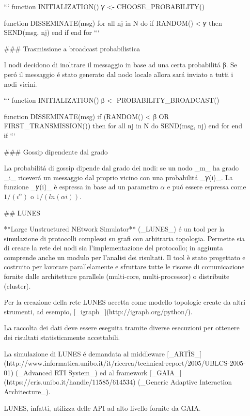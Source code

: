 ```
function INITIALIZATION()
    𝛾 <- CHOOSE\_PROBABILITY()

function DISSEMINATE(msg)
    for all nj in N do
        if RANDOM() < 𝛾 then
            SEND(msg, nj)
        end if
    end for
```

### Trasmissione a broadcast probabilistica

I nodi decidono di inoltrare il messaggio in base ad una certa probabilitá β. Se peró il messaggio é stato generato dal nodo locale allora sará inviato a tutti i nodi vicini.

```
function INITIALIZATION()
    β <- PROBABILITY\_BROADCAST()

function DISSEMINATE(msg)
    if (RANDOM() < β OR FIRST\_TRANSMISSION()) then
        for all nj in N do
            SEND(msg, nj)
        end for
    end if
```

### Gossip dipendente dal grado

La probabilitá di gossip dipende dal grado dei nodi: se un nodo \_m\_ ha grado \_i\_ riceverá un messaggio dal proprio vicino con una probabilitá \_𝛾(i)\_. La funzione \_𝛾(i)\_ è espressa in base ad un parametro $α$ e puó essere espressa come $1/(i ^ α)$ o $1/(ln(αi))$.

## LUNES

**Large Unstructured NEtwork Simulator** (\_LUNES\_) é un tool per la simulazione di protocolli complessi su grafi con arbitraria topologia. Permette sia di creare la rete dei nodi sia l'implementazione del protocollo; in aggiunta comprende anche un modulo per l'analisi dei risultati.
Il tool è stato progettato e costruito per lavorare parallelamente e sfruttare tutte le risorse di comunicazione fornite dalle architetture parallele (multi-core, multi-processor) o distribuite (cluster).

Per la creazione della rete LUNES accetta come modello topologie create da altri strumenti, ad esempio, [\_igraph\_](http://igraph.org/python/).

La raccolta dei dati deve essere eseguita tramite diverse esecuzioni per ottenere dei risultati statisticamente accettabili.

La simulazione di LUNES é demandata al middleware [\_ARTÌS\_](http://www.informatica.unibo.it/it/ricerca/technical-report/2005/UBLCS-2005-01) (\_Advanced RTI System\_) ed al framework [\_GAIA\_](https://cris.unibo.it/handle/11585/614534) (\_Generic Adaptive Interaction Architecture\_).

LUNES, infatti, utilizza delle API ad alto livello fornite da GAIA.

